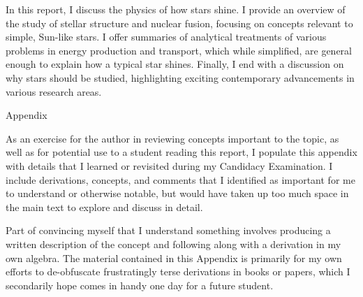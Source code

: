 \documentclass[12pt]{article}
\begin{document}
In this report, I discuss the physics of how stars shine. I provide an overview of the study of stellar structure and nuclear fusion, focusing on concepts relevant to simple, Sun-like stars. I offer summaries of analytical treatments of various problems in energy production and transport, which while simplified, are general enough to explain how a typical star shines. Finally, I end with a discussion on why stars should be studied, highlighting exciting contemporary advancements in various research areas.

\pagebreak %
\singlespacing

{}
\pagebreak


\appendix
{}
{}
\begin{center}
\Huge Appendix
\end{center}

\normalsize
As an exercise for the author in reviewing concepts important to the topic, as well as for potential use to a student reading this report, I populate this appendix with details that I learned or revisited during my Candidacy Examination. I include derivations, concepts, and comments that I identified as important for me to understand or otherwise notable, but would have taken up too much space in the main text to explore and discuss in detail.

Part of convincing myself that I understand something involves producing a written description of the concept and following along with a derivation in my own algebra. The material contained in this Appendix is primarily for my own efforts to de-obfuscate frustratingly terse derivations in books or papers, which I secondarily hope comes in handy one day for a future student.
\end{document}
